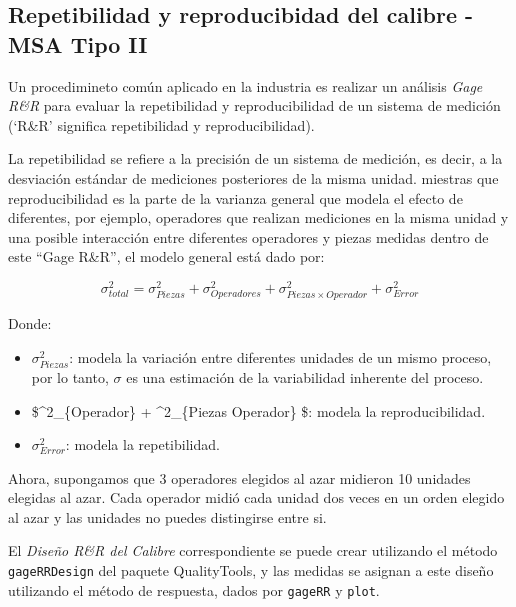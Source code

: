 \documentclass[
]{book}
\begin{document}
\hypertarget{repetibilidad-y-reproducibidad-del-calibre---msa-tipo-ii}{%
\subsection{Repetibilidad y reproducibidad del calibre - MSA Tipo II}\label{repetibilidad-y-reproducibidad-del-calibre---msa-tipo-ii}}

Un procedimineto común aplicado en la industria es realizar un análisis \emph{Gage R\&R} para evaluar la repetibilidad y reproducibilidad de un sistema de medición (`R\&R' significa repetibilidad y reproducibilidad).

La repetibilidad se refiere a la precisión de un sistema de medición, es decir, a la desviación estándar de mediciones posteriores de la misma unidad. miestras que reproducibilidad es la parte de la varianza general que modela el efecto de diferentes, por ejemplo, operadores que realizan mediciones en la misma unidad y una posible interacción entre diferentes operadores y piezas medidas dentro de este ``Gage R\&R'', el modelo general está dado por:

\[
\sigma^2_{total} = \sigma^2_{Piezas} + \sigma^2_{Operadores}  + \sigma^2_{Piezas \times Operador} + \sigma^2_{Error} 
\]

Donde:

\begin{itemize}
\item
  \(\sigma^2_{Piezas}\): modela la variación entre diferentes unidades de un mismo proceso, por lo tanto, \(\sigma\) es una estimación de la variabilidad inherente del proceso.
\item
  \$\sigma\^{}2\_\{Operador\} + \sigma\^{}2\_\{Piezas \times Operador\} \$: modela la reproducibilidad.
\item
  \(\sigma^2_{Error}\): modela la repetibilidad.
\end{itemize}

Ahora, supongamos que 3 operadores elegidos al azar midieron 10 unidades elegidas al azar. Cada operador midió cada unidad dos veces en un orden elegido al azar y las unidades no puedes distingirse entre si.

El \emph{Diseño R\&R del Calibre} correspondiente se puede crear utilizando el método \texttt{gageRRDesign} del paquete QualityTools, y las medidas se asignan a este diseño utilizando el método de respuesta, dados por \texttt{gageRR} y \texttt{plot}.
\end{document}
